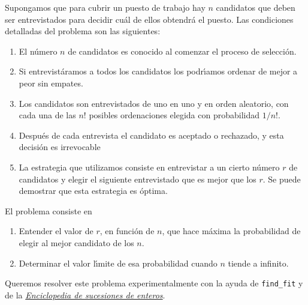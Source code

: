 \begin{ejer}
 
 Supongamos que para cubrir un puesto de trabajo hay $n$ candidatos que deben 
ser entrevistados para decidir cu\'al de ellos obtendr\'a el puesto. Las 
condiciones detalladas del problema son las siguientes:

\begin{enumerate}
 \item El n\'umero $n$ de candidatos es conocido al comenzar el proceso de 
selecci\'on.
 
 \item Si entrevist\'aramos a todos los candidatos los podr\'{\i}amos ordenar 
de mejor a peor sin empates. 
 
 \item Los candidatos son entrevistados de uno en uno y en orden aleatorio, con 
cada una de  las $n!$ posibles ordenaciones elegida con probabilidad $1/n!.$
 
 \item Despu\'es de cada entrevista el candidato es aceptado o rechazado,  y 
esta decisi\'on es irrevocable


 \item La estrategia que utilizamos consiste en entrevistar a un cierto 
n\'umero $r$ de candidatos y elegir el siguiente entrevistado que es mejor que 
los $r$. Se puede demostrar que esta estrategia es \'optima. 
 
 \end{enumerate}

El problema consiste en 
\begin{enumerate}
\item Entender el valor de $r$, en funci\'on de $n$, que hace 
m\'axima la probabilidad de elegir al mejor candidato de los $n$.
\item Determinar el valor l\'{\i}mite de esa probabilidad cuando $n$ tiende a 
infinito. 
\end{enumerate}
 
Queremos resolver este problema experimentalmente con la ayuda de 
\lstinline|find_fit| y de la  
 \href{https://oeis.org/}{{\itshape  Enciclopedia de sucesiones de enteros}}.
 
 
\end{ejer}

 

 
 

 

 
 
 
 
 
 
 
 
 
 
 
 


 



 



















